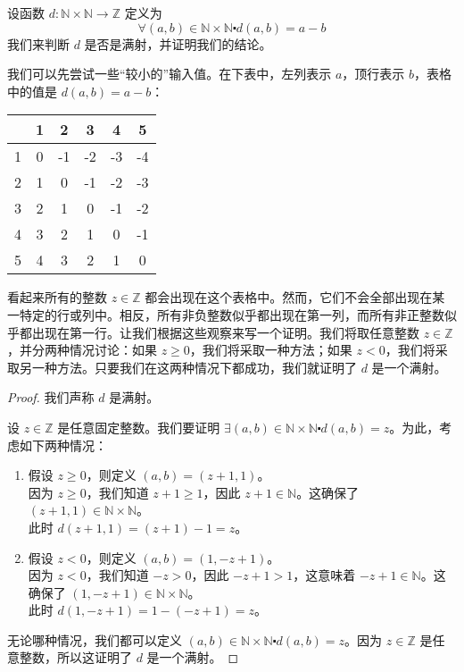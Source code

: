 \begin{example}
    设函数 $d : \mathbb{N} \times \mathbb{N} \to \mathbb{Z}$ 定义为
    \[\forall (a, b) \in \mathbb{N} \times \mathbb{N} \centerdot d(a, b) = a - b\]
    我们来判断 $d$ 是否是满射，并证明我们的结论。

    我们可以先尝试一些``较小的''输入值。在下表中，左列表示 $a$，顶行表示 $b$，表格中的值是 $d(a, b) = a - b$：
    \begin{center}
        \begin{tabular}{c|ccccc}
              & 1 & 2  & 3  & 4  & 5  \\
            \hline
            1 & 0 & -1 & -2 & -3 & -4 \\
            2 & 1 & 0  & -1 & -2 & -3 \\
            3 & 2 & 1  & 0  & -1 & -2 \\
            4 & 3 & 2  & 1  & 0  & -1 \\
            5 & 4 & 3  & 2  & 1  & 0  \\
        \end{tabular}
    \end{center}
    看起来所有的整数 $z \in \mathbb{Z}$ 都会出现在这个表格中。然而，它们不会全部出现在某一特定的行或列中。相反，所有非负整数似乎都出现在第一列，而所有非正整数似乎都出现在第一行。让我们根据这些观察来写一个证明。我们将取任意整数 $z \in \mathbb{Z}$，并分两种情况讨论：如果 $z \ge 0$，我们将采取一种方法；如果 $z < 0$，我们将采取另一种方法。只要我们在这两种情况下都成功，我们就证明了 $d$ 是一个满射。

    \begin{proof}
        我们声称 $d$ 是满射。

        设 $z \in \mathbb{Z}$ 是任意固定整数。我们要证明 $\exists (a, b) \in \mathbb{N} \times \mathbb{N} \centerdot d(a, b) = z$。为此，考虑如下两种情况：
        \begin{enumerate}[label=(\arabic*)]
            \item 假设 $z \ge 0$，则定义 $(a, b) = (z + 1, 1)$。\\
                  因为 $z \ge 0$，我们知道 $z+1 \ge 1$，因此 $z+1 \in \mathbb{N}$。这确保了 $(z + 1, 1) \in \mathbb{N} \times \mathbb{N}$。\\
                  此时 $d(z + 1, 1) = (z + 1) - 1 = z$。
            \item 假设 $z < 0$，则定义 $ (a, b) = (1, -z + 1)$。\\
                  因为 $z < 0$，我们知道 $-z > 0$，因此 $-z+1 > 1$，这意味着 $-z+1 \in \mathbb{N}$。这确保了 $(1, -z+1) \in \mathbb{N} \times \mathbb{N}$。\\
                  此时 $d(1, -z + 1) = 1 - (-z + 1) = z$。
        \end{enumerate}
        无论哪种情况，我们都可以定义 $(a, b) \in \mathbb{N} \times \mathbb{N} \centerdot d(a, b) = z$。因为 $z \in \mathbb{Z}$ 是任意整数，所以这证明了 $d$ 是一个满射。
    \end{proof}
\end{example}

